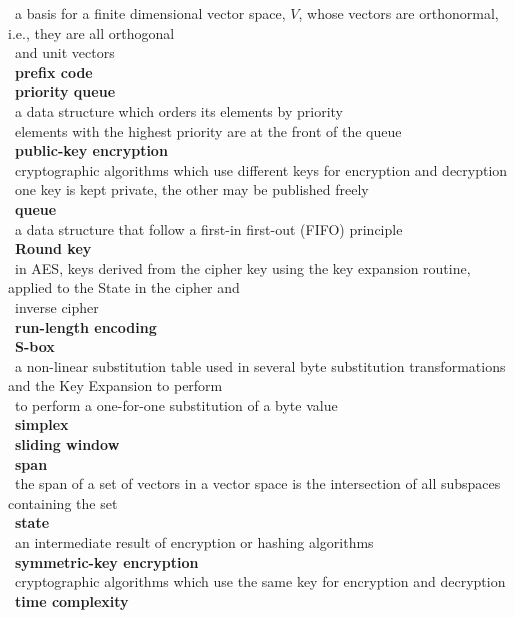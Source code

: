 \documentclass[10pt,letterpaper]{scrartcl}
\newcommand{\tbul}{\textbullet}
\newcommand{\tend}{\>\textendash}
\begin{document}
\begin{tabbing}
    \tend\ a basis for a finite dimensional vector space, $V$, whose vectors are orthonormal, i.e., they are all orthogonal \\ \>\ and unit vectors \\
\tbul\ \textbf{prefix code} \\
\tbul\ \textbf{priority queue} \\
    \tend\ a data structure which orders its elements by priority \\
    \tend\ elements with the highest priority are at the front of the queue \\
\tbul\ \textbf{public-key encryption} \\
    \tend\ cryptographic algorithms which use different keys for encryption and decryption \\
    \tend\ one key is kept private, the other may be published freely \\
\tbul\ \textbf{queue} \\
    \tend\ a data structure that follow a first-in first-out (FIFO) principle \\
\tbul\ \textbf{Round key} \\
    \tend\ in AES, keys derived from the cipher key using the key expansion routine, applied to the State in the cipher and \\ \>\ inverse cipher \\
\tbul\ \textbf{run-length encoding} \\
\tbul\ \textbf{S-box} \\
    \tend\ a non-linear substitution table used in several byte substitution transformations and the Key Expansion to perform \\ \>\ to perform a one-for-one substitution of a byte value \\
\tbul\ \textbf{simplex} \\
\tbul\ \textbf{sliding window} \\
\tbul\ \textbf{span} \\
    \tend\ the span of a set of vectors in a vector space is the intersection of all subspaces containing the set \\
\tbul\ \textbf{state} \\
    \tend\ an intermediate result of encryption or hashing algorithms \\
\tbul\ \textbf{symmetric-key encryption} \\
    \tend\ cryptographic algorithms which use the same key for encryption and decryption \\
\tbul\ \textbf{time complexity} \\

\end{tabbing}
\end{document}
